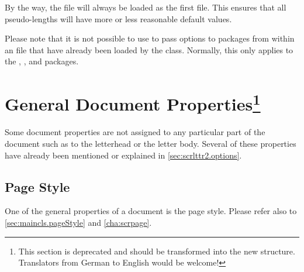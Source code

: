 By the way, the   file will always be loaded as
the first  file. This ensures that all pseudo-lengths will
have more or less reasonable default values.

Please note that it is not possible to use 
to pass options to packages from within an  file that have
already been loaded by the class. Normally, this only applies to the
, , and  packages.
%
%

\section{General Document Properties\protect\footnote{This section is
  deprecated and should be transformed into the new structure. Translators
  from German to English would be welcome!}}
\label{sec:scrlttr2.general}

Some document properties are not assigned to any particular part of
the document such as to the letterhead or the letter body. Several of
these properties have already been mentioned or explained in
\autoref{sec:scrlttr2.options}.

\subsection{Page Style}
\label{sec:scrlttr2.pageStyle} One of the general properties of a
document is the page style. Please refer also to
\autoref{sec:maincls.pageStyle} and \autoref{cha:scrpage}.

